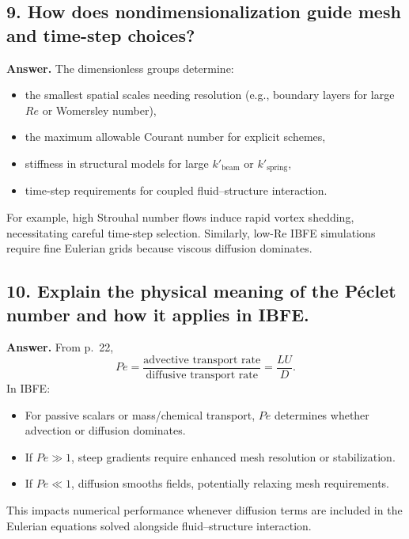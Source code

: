 \documentclass[12pt]{article}
\begin{document}
\subsection*{9. How does nondimensionalization guide mesh and time-step choices?}

\textbf{Answer.}
The dimensionless groups determine:
\begin{itemize}
    \item the smallest spatial scales needing resolution 
          (e.g., boundary layers for large $Re$ or Womersley number),
    \item the maximum allowable Courant number for explicit schemes,
    \item stiffness in structural models for large $k'_{\text{beam}}$ or 
          $k'_{\text{spring}}$,
    \item time-step requirements for coupled fluid–structure interaction.
\end{itemize}
For example, high Strouhal number flows induce rapid vortex shedding,
necessitating careful time-step selection.  
Similarly, low-Re IBFE simulations require fine Eulerian grids because viscous 
diffusion dominates.

\subsection*{10. Explain the physical meaning of the Péclet number and how it applies in IBFE.}

\textbf{Answer.}
From p.~22,
\[
Pe = \frac{\text{advective transport rate}}
         {\text{diffusive transport rate}}
       = \frac{LU}{D}.
\]
In IBFE:
\begin{itemize}
    \item For passive scalars or mass/chemical transport, $Pe$ determines
          whether advection or diffusion dominates.
    \item If $Pe \gg 1$, steep gradients require enhanced mesh resolution or
          stabilization.
    \item If $Pe \ll 1$, diffusion smooths fields, potentially relaxing mesh
          requirements.
\end{itemize}
This impacts numerical performance whenever diffusion terms are included in
the Eulerian equations solved alongside fluid–structure interaction.
\end{document}

